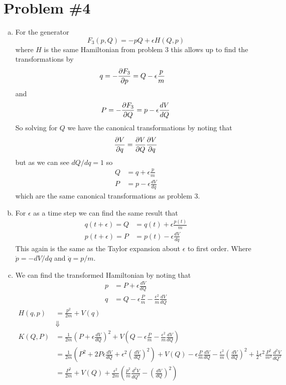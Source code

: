 \documentclass[11pt]{article}
\numberwithin{equation}{section}
\begin{document}
\section{Problem \#4}
\begin{enumerate}[(a)]
\item For the generator 
$$F_3(p,Q) = -pQ + \epsilon{H(Q,p)}$$
where $H$ is the same Hamiltonian from problem 3 this allows up to find the transformations 
by
\begin{align*}
q = -\frac{\partial{F_3}}{\partial{p}} &= Q - \epsilon\frac{p}{m}
\end{align*}
and 
$$P = -\frac{\partial{F_3}}{\partial{Q}} = p - \epsilon\frac{dV}{dQ}$$
So solving for $Q$ we have the canonical transformations by noting that
$$\frac{\partial{V}}{\partial{q}} = \frac{\partial{V}}{\partial{Q}}\frac{\partial{V}}{\partial{q}}$$
but as we can see $dQ/dq =1$ so
\begin{align*}
Q &= q + \epsilon\frac{p}{m}\\
P &= p - \epsilon\frac{dV}{dq}
\end{align*}
which are the same canonical transformations as problem 3.

\item For $\epsilon$ as a time step we can find the same result that
\begin{align*}
q(t+\epsilon) = Q &= q(t) + \epsilon\frac{p(t)}{m}\\
p(t+\epsilon) = P &= p(t) - \epsilon\frac{dV}{dq}
\end{align*}
This again is the same as the Taylor expansion about $\epsilon$ to first order. Where 
$\dot{p} = -dV/dq$ and $\dot{q} = p/m$.

\item We can find the transformed Hamiltonian by noting that
\begin{align*} 
p &= P + \epsilon\frac{dV}{dQ}\\
q &= Q - \epsilon\frac{P}{m} - \frac{\epsilon^2}{m}\frac{dV}{dQ}
\end{align*} 
\begin{align*}
H(q,p) &= \frac{p^2}{2m} + V(q)\\
&\Downarrow\\
K(Q,P) &= \frac{1}{2m}\left(P+\epsilon\frac{dV}{dQ}\right)^2 + V\left(Q-\epsilon\frac{P}{m} - \frac{\epsilon^2}{m}\frac{dV}{dQ}\right)\\
&= \frac{1}{2m}\left(P^2+2P\epsilon\frac{dV}{dQ}+\epsilon^2\left(\frac{dV}{dQ}\right)^2\right) + V(Q) - \epsilon\frac{P}{m}\frac{dV}{dQ} - \frac{\epsilon^2}{m}\left(\frac{dV}{dQ}\right)^2 + \frac{1}{2}\epsilon^2\frac{P^2}{m^2}\frac{d^2V}{dQ^2}\\
&= \frac{P^2}{2m} + V(Q) +\frac{\epsilon^2}{2m}\left(\frac{p^2}{m}\frac{d^2V}{dQ^2}-\left(\frac{dV}{dQ}\right)^2 \right)
\end{align*}


\end{enumerate}
\end{document}
